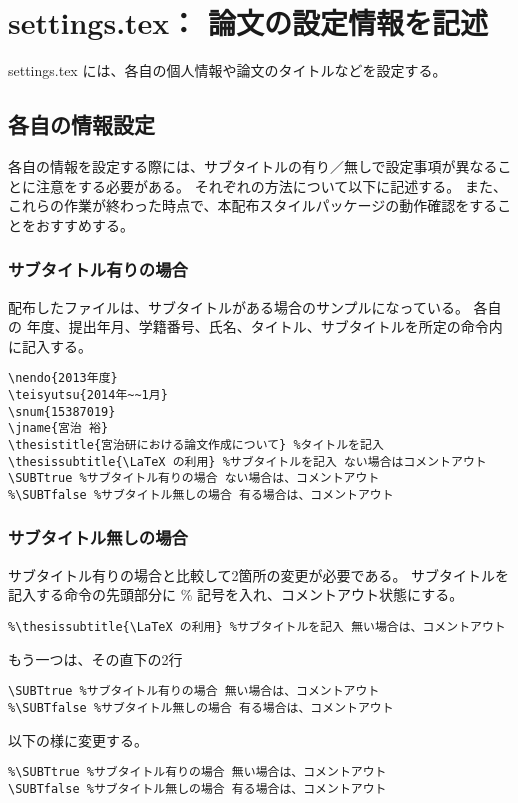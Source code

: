 \section{settings.tex： 論文の設定情報を記述}
settings.tex には、各自の個人情報や論文のタイトルなどを設定する。

\subsection{各自の情報設定}
各自の情報を設定する際には、サブタイトルの有り／無しで設定事項が異なることに注意をする必要がある。
それぞれの方法について以下に記述する。
また、これらの作業が終わった時点で、本配布スタイルパッケージの動作確認をすることをおすすめする。

\subsubsection{サブタイトル有りの場合}
配布したファイルは、サブタイトルがある場合のサンプルになっている。
各自の 年度、提出年月、学籍番号、氏名、タイトル、サブタイトルを所定の命令内に記入する。
\begin{breakbox}
{\small
\begin{verbatim}
\nendo{2013年度}
\teisyutsu{2014年~~1月}
\snum{15387019}
\jname{宮治 裕}
\thesistitle{宮治研における論文作成について} %タイトルを記入
\thesissubtitle{\LaTeX の利用} %サブタイトルを記入 ない場合はコメントアウト
\SUBTtrue %サブタイトル有りの場合 ない場合は、コメントアウト
%\SUBTfalse %サブタイトル無しの場合 有る場合は、コメントアウト
\end{verbatim}
}
\end{breakbox}

\subsubsection{サブタイトル無しの場合}
サブタイトル有りの場合と比較して2箇所の変更が必要である。
サブタイトルを記入する命令の先頭部分に \% 記号を入れ、コメントアウト状態にする。

\begin{breakbox}
{\small
\begin{verbatim}
%\thesissubtitle{\LaTeX の利用} %サブタイトルを記入 無い場合は、コメントアウト
\end{verbatim}
}
\end{breakbox}
もう一つは、その直下の2行
\begin{breakbox}
{\small
\begin{verbatim}
\SUBTtrue %サブタイトル有りの場合 無い場合は、コメントアウト
%\SUBTfalse %サブタイトル無しの場合 有る場合は、コメントアウト
\end{verbatim}
}
\end{breakbox}
以下の様に変更する。
\begin{breakbox}
{\small
\begin{verbatim}
%\SUBTtrue %サブタイトル有りの場合 無い場合は、コメントアウト
\SUBTfalse %サブタイトル無しの場合 有る場合は、コメントアウト
\end{verbatim}
}
\end{breakbox}

